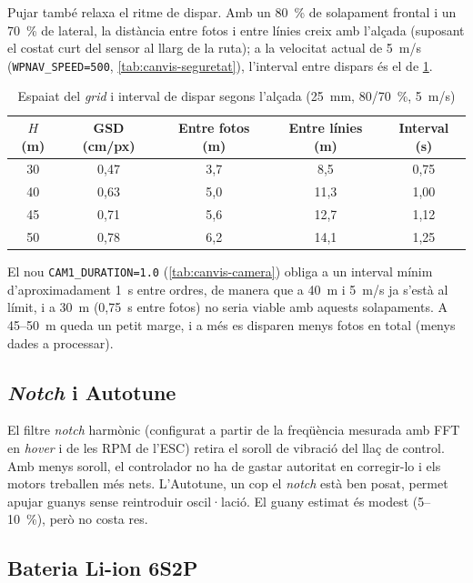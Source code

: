 Pujar també relaxa el ritme de dispar. Amb un 80~\% de solapament frontal i un 70~\% de lateral, la distància entre fotos i entre línies creix amb l'alçada (suposant el costat curt del sensor al llarg de la ruta); a la velocitat actual de 5~m/s (\texttt{WPNAV\_SPEED=500}, \cref{tab:canvis-seguretat}), l'interval entre dispars és el de \cref{tab:ritme-dispar}.

\begin{table}[H]
    \centering
    \caption{Espaiat del \emph{grid} i interval de dispar segons l'alçada (25~mm, 80/70~\%, 5~m/s)}
    \label{tab:ritme-dispar}
    \small
    \begin{tabular}{ccccc}
        \toprule
        $H$ (m) & GSD (cm/px) & Entre fotos (m) & Entre línies (m) & Interval (s) \\
        \midrule
        30 & 0,47 & 3,7 & 8,5 & 0,75 \\
        40 & 0,63 & 5,0 & 11,3 & 1,00 \\
        45 & 0,71 & 5,6 & 12,7 & 1,12 \\
        50 & 0,78 & 6,2 & 14,1 & 1,25 \\
        \bottomrule
    \end{tabular}
\end{table}

El nou \texttt{CAM1\_DURATION=1.0} (\cref{tab:canvis-camera}) obliga a un interval mínim d'aproximadament 1~s entre ordres, de manera que a 40~m i 5~m/s ja s'està al límit, i a 30~m (0,75~s entre fotos) no seria viable amb aquests solapaments. A 45--50~m queda un petit marge, i a més es disparen menys fotos en total (menys dades a processar).

\subsection{\emph{Notch} i Autotune}
\label{subsec:autonomia-notch}

El filtre \emph{notch} harmònic (configurat a partir de la freqüència mesurada amb FFT en \emph{hover} i de les RPM de l'ESC) retira el soroll de vibració del llaç de control. Amb menys soroll, el controlador no ha de gastar autoritat en corregir-lo i els motors treballen més nets. L'Autotune, un cop el \emph{notch} està ben posat, permet apujar guanys sense reintroduir oscil·lació. El guany estimat és modest (5--10~\%), però no costa res.

\subsection{Bateria Li-ion 6S2P}
\label{subsec:autonomia-liion}

